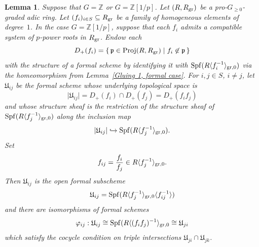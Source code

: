\documentclass[12pt,twoside,a4paper]{article}
\newtheorem{lemma}[thm]{Lemma}
\theoremstyle{definition}
\theoremstyle{remark}
\newcommand\gr{{\rm gr}}
\newcommand\Proj{{\rm Proj}}
\newcommand\Spf{{\rm Spf}}
\begin{document}
\begin{lemma}\label{Gluing 1, formal case, part 2}Suppose that $G=\mathbb{Z}$ or $G=\mathbb{Z}[1/p]$. Let $(R, R_{\gr})$ be a pro-$G_{\geq0}$-graded adic ring. Let $(f_{i})_{i\in S} \subseteq R_{\gr}$ be a family of homogeneous elements of degree~$1$. In the case $G=\mathbb{Z}[1/p]$, suppose that each $f_{i}$ admits a compatible system of $p$-power roots in $R_{\gr}$. Endow each \begin{equation*}D_{+}(f_{i})=\{\, \mathfrak{p}\in \Proj(R, R_{\gr})\mid f_{i}\not\in \mathfrak{p}\,\}\end{equation*}with the structure of a formal scheme by identifying it with $\Spf(R\langle f_{i}^{-1}\rangle_{\gr,0})$ via the homeomorphism from Lemma~\ref{Gluing 1, formal case}. For $i, j\in S$, $i\neq j$, let $\mathfrak{U}_{ij}$ be the formal scheme whose underlying topological space is \begin{equation*}\vert \mathfrak{U}_{ij}\vert=D_{+}(f_{i})\cap D_{+}(f_{j})=D_{+}(f_{i}f_{j})\end{equation*}and whose structure sheaf is the restriction of the structure sheaf of $\Spf(R\langle f_{j}^{-1}\rangle_{\gr,0})$ along the inclusion map \begin{equation*}\vert \mathfrak{U}_{ij}\vert\hookrightarrow \Spf(R\langle f_{j}^{-1}\rangle_{\gr,0}).\end{equation*}Set \begin{equation*}f_{ij}=\frac{f_{i}}{f_{j}}\in R\langle f_{j}^{-1}\rangle_{\gr,0}.\end{equation*}Then $\mathfrak{U}_{ij}$ is the open formal subscheme \begin{equation*}\mathfrak{U}_{ij}=\Spf(R\langle f_{j}^{-1}\rangle_{\gr,0}\langle f_{ij}^{-1}\rangle)\end{equation*}and there are isomorphisms of formal schemes\begin{equation*}\varphi_{ij}: \mathfrak{U}_{ij}\cong \Spf(R\langle (f_{i}f_{j})^{-1}\rangle_{\gr,0}\cong \mathfrak{U}_{ji}\end{equation*}which satisfy the cocycle condition on triple intersections $\mathfrak{U}_{ji}\cap \mathfrak{U}_{jk}$. \end{lemma} 
\end{document}
